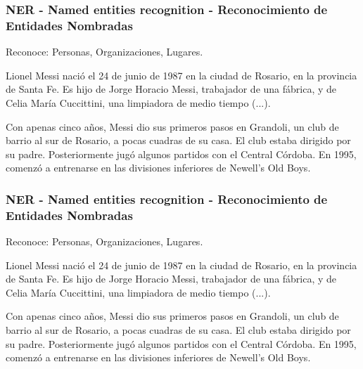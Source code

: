 \fontsize{9.5pt}{9.2}\selectfont

\begin{frame}
  \frametitle{NER - Named entities recognition - Reconocimiento de Entidades Nombradas}
  Reconoce: Personas, Organizaciones, Lugares. \newline

  Lionel Messi nació el 24 de junio de 1987 en la ciudad de Rosario, en la provincia de Santa Fe. Es hijo de Jorge Horacio Messi, trabajador de una fábrica, y de Celia María Cuccittini, una limpiadora de medio tiempo (...).\newline

  Con apenas cinco años, Messi dio sus primeros pasos en Grandoli, un club de barrio al sur de Rosario, a pocas cuadras de su casa. El club estaba dirigido por su padre. Posteriormente jugó algunos partidos con el Central Córdoba. En 1995, comenzó a entrenarse en las divisiones inferiores de Newell's Old Boys.
\end{frame}


\begin{frame}
  \frametitle{NER - Named entities recognition - Reconocimiento de Entidades Nombradas}
  Reconoce: {\color{red}Personas}, {\color{blue}Organizaciones}, {\color{green}Lugares}. \newline

  {\color{red}Lionel Messi} nació el 24 de junio de 1987 en la ciudad de {\color{green}Rosario}, en la provincia de {\color{green}Santa Fe}. Es hijo de {\color{red}Jorge Horacio Messi}, trabajador de una fábrica, y de {\color{red}Celia María Cuccittini}, una limpiadora de medio tiempo (...).\newline

  Con apenas cinco años, {\color{red}Messi} dio sus primeros pasos en {\color{blue}Grandoli}, un club de barrio al sur de {\color{green}Rosario}, a pocas cuadras de su casa. El club estaba dirigido por su padre. Posteriormente jugó algunos partidos con el {\color{blue}Central Córdoba}. En 1995, comenzó a entrenarse en las divisiones inferiores de {\color{blue}Newell's Old Boys}.


\end{frame}

